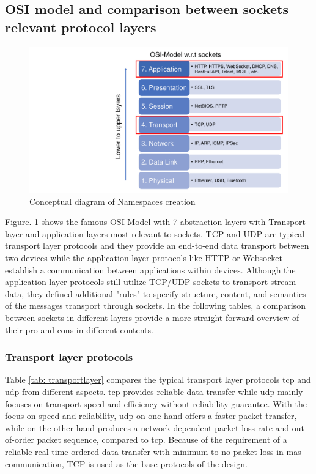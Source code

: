 \subsection{OSI model and comparison between sockets relevant protocol layers}
\begin{figure}[htbp]
\includegraphics[width=12cm]{figures/OSI.pdf}
\centering
\caption{Conceptual diagram of Namespaces creation\label{fig: OSI}}
\end{figure}

Figure. \ref{fig: OSI} shows the famous OSI-Model with 7 abstraction layers with Transport layer and application layers most relevant to sockets. TCP and UDP are typical transport layer protocols and they provide an end-to-end data transport between two devices while the application layer protocols like HTTP or Websocket establish a communication between applications within devices. Although the application layer protocols still utilize TCP/UDP sockets to transport stream data, they defined additional "rules" to specify structure, content, and semantics of the messages transport through sockets. In the following tables, a comparison between sockets in different layers provide a more straight forward overview of their pro and cons in different contents.

\subsubsection{Transport layer protocols}


Table \ref{tab: transportlayer} compares the typical transport layer protocols \gls{tcp} and \gls{udp} from different aspects.  
\gls{tcp} provides reliable data transfer while \gls{udp} mainly focuses on transport speed and efficiency without reliability guarantee. 
With the focus on speed and reliability, \gls{udp} on one hand offers a faster packet transfer, while on the other hand produces a network dependent packet loss rate and out-of-order packet sequence, compared to \gls{tcp}. 
Because of the requirement of a reliable real time ordered data transfer with minimum to no packet loss in \gls{mas} communication, TCP is used as the base protocols of the design. 


